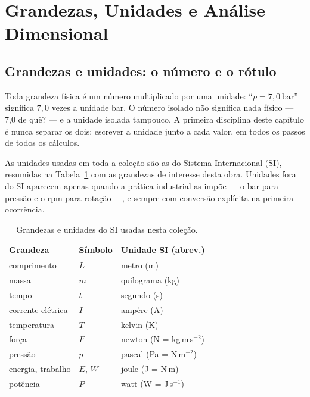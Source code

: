 \documentclass[12pt,a4paper]{article}
\numberwithin{equation}{section}
\numberwithin{table}{section}
\numberwithin{figure}{section}
\begin{document}
\clearpage
\section{Grandezas, Unidades e Análise Dimensional}\label{sec:v0-unidades}

\subsection{Grandezas e unidades: o número e o rótulo}

Toda grandeza física é um número multiplicado por uma unidade:
``$p = 7{,}0\ \mathrm{bar}$'' significa $7{,}0$ vezes a unidade bar.
O número isolado não significa nada físico --- 7,0 de quê? --- e a unidade
isolada tampouco. A primeira disciplina deste capítulo é nunca separar os
dois: escrever a unidade junto a cada valor, em todos os passos de todos os
cálculos.

As unidades usadas em toda a coleção são as do Sistema Internacional (SI),
resumidas na Tabela~\ref{tab:v0-c3-1} com as grandezas de interesse desta
obra. Unidades fora do SI aparecem apenas quando a prática industrial as
impõe --- o bar para pressão e o rpm para rotação ---, e sempre com conversão
explícita na primeira ocorrência.

\begin{table}[H]
\centering
\caption[Unidades do SI usadas nesta coleção.]{%
Grandezas e unidades do SI usadas nesta coleção.}
\label{tab:v0-c3-1}
\begin{tabularx}{\textwidth}{llX}
\toprule
\textbf{Grandeza} & \textbf{Símbolo} & \textbf{Unidade SI (abrev.)} \\
\midrule
comprimento & $L$ & metro (m) \\
massa & $m$ & quilograma (kg) \\
tempo & $t$ & segundo (s) \\
corrente elétrica & $I$ & ampère (A) \\
temperatura & $T$ & kelvin (K) \\
\midrule
força & $F$ & newton (N = kg\,m\,s$^{-2}$) \\
pressão & $p$ & pascal (Pa = N\,m$^{-2}$) \\
energia, trabalho & $E$, $W$ & joule (J = N\,m) \\
potência & $P$ & watt (W = J\,s$^{-1}$) \\
\bottomrule
\end{tabularx}
\end{table}
\end{document}
